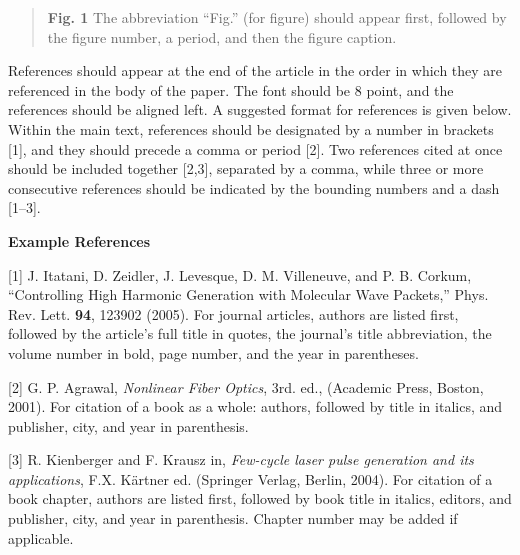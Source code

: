 \documentclass{article}
\begin{document}
\begin{quotation}
\vspace{2ex}

\vspace{5cm}

\vspace{2ex}
\noindent\footnotesize\textbf{Fig. 1}
The abbreviation ``Fig.'' (for figure) should appear first, followed
by the figure number, a period, and then the figure caption.
\end{quotation}

References should appear at the end of the article in the order in
which they are referenced in the body of the paper. The font should be
8 point, and the references should be aligned left. A suggested format
for references is given below. Within the main text, references should
be designated by a number in brackets [1], and they should precede a
comma or period [2]. Two references cited at once should be included
together [2,3], separated by a comma, while three or more consecutive
references should be indicated by the bounding numbers and a dash
[1–3].

\setlength\parindent{0pt}\vspace{2ex}
\textbf{Example References}

\footnotesize
[1] J. Itatani, D. Zeidler, J. Levesque, D. M. Villeneuve, and P. B.
Corkum, ``Controlling High Harmonic Generation with Molecular Wave
Packets,'' Phys. Rev. Lett. \textbf{94}, 123902 (2005). For journal
articles, authors are listed first, followed by the article’s full
title in quotes, the journal’s title abbreviation, the volume number
in bold, page number, and the year in parentheses.

[2] G. P. Agrawal, \textit{Nonlinear Fiber Optics}, 3rd. ed.,
(Academic Press, Boston, 2001). For citation of a book as a whole:
authors, followed by title in italics, and publisher, city, and year
in parenthesis.

[3] R. Kienberger and F. Krausz in, \textit{Few-cycle laser pulse
generation and its applications}, F.X. Kärtner ed. (Springer Verlag,
Berlin, 2004). For citation of a book chapter, authors are listed
first, followed by book title in italics, editors, and publisher,
city, and year in parenthesis. Chapter number may be added if
applicable.
\end{document}
